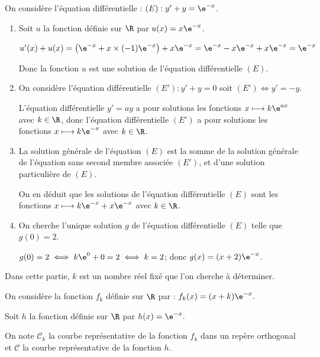 \medskip


\medskip


On considère l'équation différentielle :  $(E): y' + y = \e^{-x}$.

\begin{enumerate}
\item Soit $u$ la fonction définie sur $\R$ par $u(x) = x \e^{-x}$.


$u'(x)+u(x)=\left (\e^{-x}+x\times (-1)\e^{-x}\right )+x\e^{-x}
=\e^{-x}-x\e^{-x} + x\e^{-x} = \e^{-x}$

Donc  la fonction $u$ est une solution de l'équation différentielle $(E)$.

\item On considère l'équation différentielle $\left(E'\right): y' + y = 0$ soit $\left(E'\right) \iff y'=-y$.

L'équation différentielle $y'=ay$ a pour solutions les fonctions $x \longmapsto k\e^{ax}$ avec \mbox{$k\in\R$}, donc l'équation différentielle $\left(E'\right)$ a pour solutions les fonctions $x \longmapsto k\e^{-x}$ avec $k\in\R$.

\item 
La solution générale de l'équation $(E)$ est la somme de la solution générale de l'équation sans second membre associée $(E')$, et d'une solution particulière de $(E)$.

On en déduit que les solutions de l'équation différentielle $(E)$ sont les fonctions $x \longmapsto k\e^{-x} + x\e^{-x}$ avec $k\in\R$.

\item On cherche l'unique solution $g$ de l'équation différentielle $(E)$ telle que $g(0) = 2$.

$g(0)=2 \iff k\e^{0}+0=2 \iff k=2$; donc $g(x)=(x+2)\e^{-x}$.
\end{enumerate}


\medskip


\medskip


Dans cette partie, $k$ est un nombre réel fixé que l'on cherche à déterminer.

On considère la fonction $f_{k}$ définie sur $\R$ par : $f_{k}(x) = (x + k) \e^{-x}.$

Soit $h$ la fonction définie sur $\R$ par $h(x) = \e^{-x}.$

On note $\mathcal{C}_{k}$ la courbe représentative de la fonction $f_{k}$ dans un repère orthogonal et $\mathcal{C}$ la courbe représentative de la fonction $h$.

